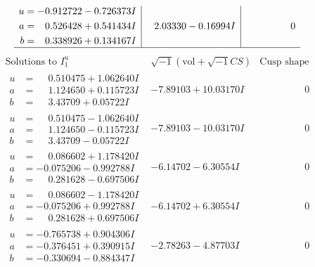\documentclass[1p]{elsarticle_modified}
\theoremstyle{definition}
\newcommand{\I}{\sqrt{-1}}
\begin{document}
$$\begin{array}{c|c|c}
\begin{aligned}
u &= -0.912722 - 0.726373 I \\
a &= \phantom{-}0.526428 + 0.541434 I \\
b &= \phantom{-}0.338926 + 0.134167 I\end{aligned}
 & \phantom{-}2.03330 - 0.16994 I & \phantom{-0.000000 } 0\\
 \hline 
 \end{array}$$\newpage$$\begin{array}{c|c|c}  
\text{Solutions to }I^u_{1}& \I (\text{vol} + \sqrt{-1}CS) & \text{Cusp shape}\\
 \hline 
\begin{aligned}
u &= \phantom{-}0.510475 + 1.062640 I \\
a &= \phantom{-}1.124650 + 0.115723 I \\
b &= \phantom{-}3.43709 + 0.05722 I\end{aligned}
 & -7.89103 + 10.03170 I & \phantom{-0.000000 } 0 \\ \hline\begin{aligned}
u &= \phantom{-}0.510475 - 1.062640 I \\
a &= \phantom{-}1.124650 - 0.115723 I \\
b &= \phantom{-}3.43709 - 0.05722 I\end{aligned}
 & -7.89103 - 10.03170 I & \phantom{-0.000000 } 0 \\ \hline\begin{aligned}
u &= \phantom{-}0.086602 + 1.178420 I \\
a &= -0.075206 - 0.992788 I \\
b &= \phantom{-}0.281628 - 0.697506 I\end{aligned}
 & -6.14702 - 6.30554 I & \phantom{-0.000000 } 0 \\ \hline\begin{aligned}
u &= \phantom{-}0.086602 - 1.178420 I \\
a &= -0.075206 + 0.992788 I \\
b &= \phantom{-}0.281628 + 0.697506 I\end{aligned}
 & -6.14702 + 6.30554 I & \phantom{-0.000000 } 0 \\ \hline\begin{aligned}
u &= -0.765738 + 0.904306 I \\
a &= -0.376451 + 0.390915 I \\
b &= -0.330694 - 0.884347 I\end{aligned}
 & -2.78263 - 4.87703 I & \phantom{-0.000000 } 0 \\ \hline\begin{aligned}

\end{aligned}
\end{array}$$
\end{document}
